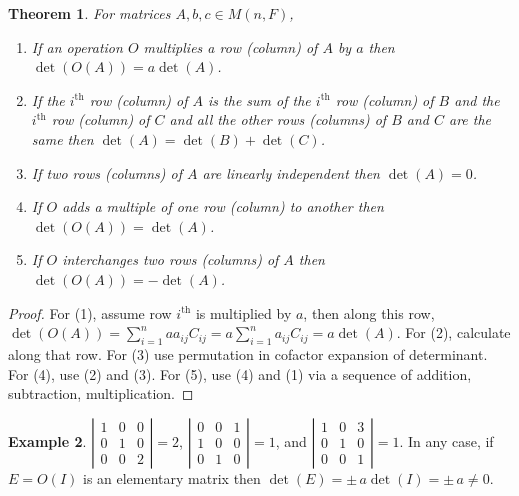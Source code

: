 \documentclass[12pt]{amsart}
\newtheorem{theorem}{Theorem}[section]
\theoremstyle{definition}
\newtheorem{example}[theorem]{Example}
\begin{document}
\begin{theorem}\label{elementaryrowoperationsdet} For matrices $A, b, c \in M(n, F)$,
\begin{enumerate}[\indent 1.]
\item If an operation $O$ multiplies a row (column) of $A$ by $a$ then $\det(O(A)) = a \det(A)$.
\item If the $i^{\text{th}}$ row (column) of $A$ is the sum of the $i^{\text{th}}$ row (column) of $B$ and the $i^{\text{th}}$ row (column) of $C$ and all the other rows (columns) of $B$ and $C$ are the same then $\det(A) = \det(B) + \det(C)$.
\item If two rows (columns) of $A$ are linearly independent then $\det(A) = 0$.
\item If $O$ adds a multiple of one row (column) to another then $\det(O(A)) = \det(A)$.
\item If $O$ interchanges two rows (columns) of $A$ then $\det(O(A)) = - \det(A)$.
\end{enumerate}
\end{theorem}
\begin{proof} For (1), assume row $i^{\text{th}}$ is multiplied by $a$, then along this row, $\det(O(A)) = \sum\limits_{i = 1}^n a a_{ij}C_{ij} = a \sum\limits_{i=1}^n a_{ij}C_{ij} = a \det(A)$. For (2), calculate along that row. For (3) use permutation in cofactor expansion of determinant. For (4), use (2) and (3). For (5), use (4) and (1) via a sequence of addition, subtraction, multiplication.
\end{proof}

\begin{example}\label{detofelementarymatrix} $\left\vert \begin{array}{ccc} 1 & 0 & 0 \\ 0 & 1 & 0 \\ 0 & 0 & 2 \end{array}\right\vert = 2$, $\label{} \left\vert \begin{array}{ccc} 0 & 0 & 1 \\ 1 & 0 & 0 \\ 0 & 1 & 0 \end{array}\right\vert = 1$, and $\label{} \left\vert \begin{array}{ccc} 1 & 0 & 3 \\ 0 & 1 & 0 \\ 0 & 0 & 1 \end{array}\right\vert = 1$. In any case, if $E = O(I)$ is an elementary matrix then $\det(E) = \pm \, a \det(I) = \pm \, a \neq 0$.
\end{example}
\end{document}
